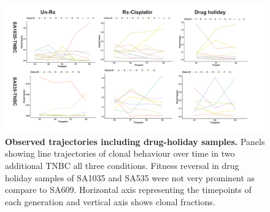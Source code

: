 \begin{figure}
\centering
\includegraphics[width=\textwidth]{Figures/drugholidaysamples.pdf}
	
\caption[TNBC-SA609 PDX reproducible clonal dynamics with and without treatment]
	{\small
\textbf{Observed trajectories including drug-holiday samples.}
Panels showing line trajectories of clonal behaviour over time in two additional TNBC all three conditions. Fitness reversal in drug holiday samples of SA1035 and SA535 were not very prominent as compare to SA609. Horizontal axis representing the timepoints of each generation and vertical axis shows clonal fractions.
	}
	\label{fig:Untreated timeseries growth curves only}
\end{figure}






